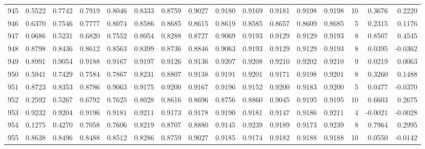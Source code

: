 \begin{tabular}{lrrrrrrrrrrrrrrr}
945 &      0.5522 &  0.7742 &  0.7919 &  0.8046 &  0.8333 &  0.8759 &  0.9027 &  0.9180 &  0.9169 &  0.9181 &   0.9198 &     0.9198 &     10 &                    0.3676 &                     0.2220 \\
946 &      0.6370 &  0.7546 &  0.7777 &  0.8074 &  0.8586 &  0.8685 &  0.8615 &  0.8619 &  0.8585 &  0.8657 &   0.8609 &     0.8685 &      5 &                    0.2315 &                     0.1176 \\
947 &      0.0686 &  0.5231 &  0.6820 &  0.7552 &  0.8054 &  0.8288 &  0.8727 &  0.9069 &  0.9193 &  0.9129 &   0.9129 &     0.9193 &      8 &                    0.8507 &                     0.4545 \\
948 &      0.8798 &  0.8436 &  0.8612 &  0.8563 &  0.8399 &  0.8736 &  0.8846 &  0.9063 &  0.9193 &  0.9129 &   0.9129 &     0.9193 &      8 &                    0.0395 &                    -0.0362 \\
949 &      0.8991 &  0.9054 &  0.9188 &  0.9167 &  0.9197 &  0.9126 &  0.9136 &  0.9207 &  0.9208 &  0.9210 &   0.9202 &     0.9210 &      9 &                    0.0219 &                     0.0063 \\
950 &      0.5941 &  0.7429 &  0.7584 &  0.7867 &  0.8231 &  0.8807 &  0.9138 &  0.9191 &  0.9201 &  0.9171 &   0.9198 &     0.9201 &      8 &                    0.3260 &                     0.1488 \\
951 &      0.8723 &  0.8353 &  0.8786 &  0.9063 &  0.9175 &  0.9200 &  0.9167 &  0.9196 &  0.9152 &  0.9200 &   0.9183 &     0.9200 &      5 &                    0.0477 &                    -0.0370 \\
952 &      0.2592 &  0.5267 &  0.6792 &  0.7625 &  0.8028 &  0.8616 &  0.8696 &  0.8756 &  0.8860 &  0.9045 &   0.9195 &     0.9195 &     10 &                    0.6603 &                     0.2675 \\
953 &      0.9232 &  0.9204 &  0.9196 &  0.9181 &  0.9211 &  0.9173 &  0.9178 &  0.9190 &  0.9181 &  0.9147 &   0.9186 &     0.9211 &      4 &                   -0.0021 &                    -0.0028 \\
954 &      0.1275 &  0.4270 &  0.7058 &  0.7606 &  0.8219 &  0.8707 &  0.8880 &  0.9145 &  0.9239 &  0.9189 &   0.9173 &     0.9239 &      8 &                    0.7964 &                     0.2995 \\
955 &      0.8638 &  0.8496 &  0.8488 &  0.8512 &  0.8286 &  0.8759 &  0.9027 &  0.9185 &  0.9174 &  0.9182 &   0.9188 &     0.9188 &     10 &                    0.0550 &                    -0.0142 \\

\end{tabular}
